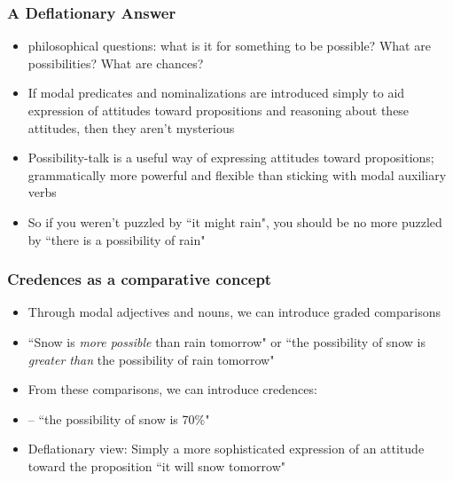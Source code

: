\begin{frame}
\frametitle{A Deflationary Answer}

\begin{itemize}[<+->]

\item philosophical questions: what is it for something to be possible? What are possibilities? What are chances?

\item If modal predicates and nominalizations are introduced simply to aid expression of attitudes toward propositions and reasoning about these attitudes, then they aren't mysterious

\item Possibility-talk is a useful way of expressing attitudes toward propositions; grammatically more powerful and flexible than sticking with modal auxiliary verbs 

\item So if you weren't puzzled by ``it might rain", you should be no more puzzled by ``there is a possibility of rain"

\end{itemize}
\end{frame}

\begin{frame}
\frametitle{Credences as a comparative concept}

\begin{itemize}[<+->]

\item Through modal adjectives and nouns, we can introduce graded comparisons

\item ``Snow is \textit{more possible} than rain tomorrow" or ``the possibility of snow is \textit{greater than} the possibility of rain tomorrow"

\item From these comparisons, we can introduce credences:

\item[] -- ``the possibility of snow is 70\%" 

\item Deflationary view: Simply a more sophisticated expression of an attitude toward the proposition ``it will snow tomorrow"



\end{itemize}
\end{frame}

